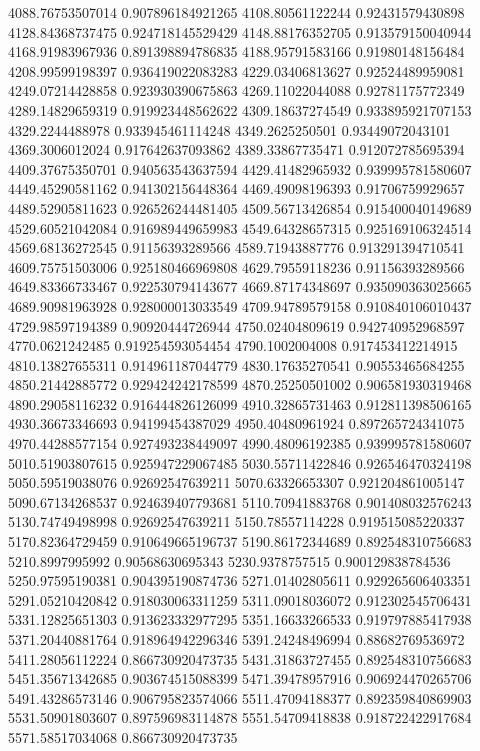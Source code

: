 {4088.76753507014 0.907896184921265
4108.80561122244 0.92431579430898
4128.84368737475 0.924718145529429
4148.88176352705 0.913579150040944
4168.91983967936 0.891398894786835
4188.95791583166 0.91980148156484
4208.99599198397 0.936419022083283
4229.03406813627 0.92524489959081
4249.07214428858 0.923930390675863
4269.11022044088 0.92781175772349
4289.14829659319 0.919923448562622
4309.18637274549 0.933895921707153
4329.2244488978 0.933945461114248
4349.2625250501 0.93449072043101
4369.3006012024 0.917642637093862
4389.33867735471 0.912072785695394
4409.37675350701 0.940563543637594
4429.41482965932 0.939995781580607
4449.45290581162 0.941302156448364
4469.49098196393 0.91706759929657
4489.52905811623 0.926526244481405
4509.56713426854 0.915400040149689
4529.60521042084 0.916989449659983
4549.64328657315 0.925169106324514
4569.68136272545 0.91156393289566
4589.71943887776 0.913291394710541
4609.75751503006 0.925180466969808
4629.79559118236 0.91156393289566
4649.83366733467 0.922530794143677
4669.87174348697 0.935090363025665
4689.90981963928 0.928000013033549
4709.94789579158 0.910840106010437
4729.98597194389 0.90920444726944
4750.02404809619 0.942740952968597
4770.0621242485 0.919254593054454
4790.1002004008 0.917453412214915
4810.13827655311 0.914961187044779
4830.17635270541 0.90553465684255
4850.21442885772 0.929424242178599
4870.25250501002 0.906581930319468
4890.29058116232 0.916444826126099
4910.32865731463 0.912811398506165
4930.36673346693 0.94199454387029
4950.40480961924 0.897265724341075
4970.44288577154 0.927493238449097
4990.48096192385 0.939995781580607
5010.51903807615 0.925947229067485
5030.55711422846 0.926546470324198
5050.59519038076 0.92692547639211
5070.63326653307 0.921204861005147
5090.67134268537 0.924639407793681
5110.70941883768 0.901408032576243
5130.74749498998 0.92692547639211
5150.78557114228 0.919515085220337
5170.82364729459 0.910649665196737
5190.86172344689 0.892548310756683
5210.8997995992 0.90568630695343
5230.9378757515 0.900129838784536
5250.97595190381 0.904395190874736
5271.01402805611 0.929265606403351
5291.05210420842 0.918030063311259
5311.09018036072 0.912302545706431
5331.12825651303 0.913623332977295
5351.16633266533 0.919797885417938
5371.20440881764 0.918964942296346
5391.24248496994 0.88682769536972
5411.28056112224 0.866730920473735
5431.31863727455 0.892548310756683
5451.35671342685 0.903674515088399
5471.39478957916 0.906924470265706
5491.43286573146 0.906795823574066
5511.47094188377 0.892359840869903
5531.50901803607 0.897596983114878
5551.54709418838 0.918722422917684
5571.58517034068 0.866730920473735
}
